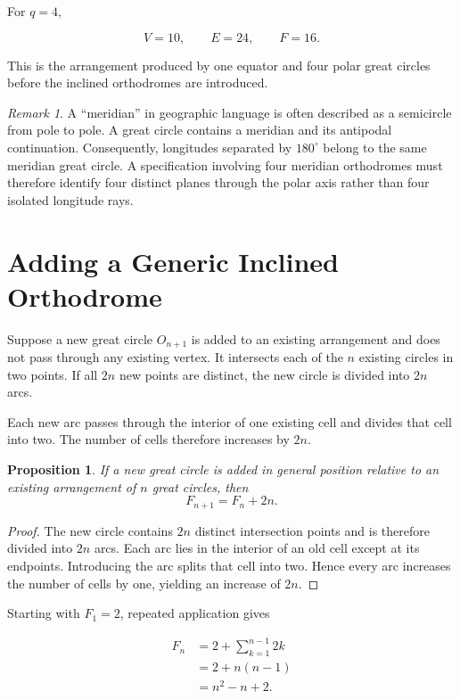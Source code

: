 \documentclass[11pt,fleqn]{book}
\numberwithin{equation}{chapter}
\theoremstyle{plain}
\newtheorem{proposition}[theorem]{Proposition}
\theoremstyle{definition}
\theoremstyle{remark}
\newtheorem{remark}[theorem]{Remark}
\begin{document}
For \(q=4\),

\begin{equation}
    V=10,
    \qquad
    E=24,
    \qquad
    F=16.
\end{equation}

This is the arrangement produced by one equator and four polar great circles before the inclined orthodromes are introduced.

\begin{remark}
A ``meridian'' in geographic language is often described as a semicircle from pole to pole. A great circle contains a meridian and its antipodal continuation. Consequently, longitudes separated by \(180^\circ\) belong to the same meridian great circle. A specification involving four meridian orthodromes must therefore identify four distinct planes through the polar axis rather than four isolated longitude rays.
\end{remark}

\section{Adding a Generic Inclined Orthodrome}

Suppose a new great circle \(O_{n+1}\) is added to an existing arrangement and does not pass through any existing vertex. It intersects each of the \(n\) existing circles in two points. If all \(2n\) new points are distinct, the new circle is divided into \(2n\) arcs.

Each new arc passes through the interior of one existing cell and divides that cell into two. The number of cells therefore increases by \(2n\).

\begin{proposition}
If a new great circle is added in general position relative to an existing arrangement of \(n\) great circles, then
\[
F_{n+1}=F_n+2n.
\]
\end{proposition}

\begin{proof}
The new circle contains \(2n\) distinct intersection points and is therefore divided into \(2n\) arcs. Each arc lies in the interior of an old cell except at its endpoints. Introducing the arc splits that cell into two. Hence every arc increases the number of cells by one, yielding an increase of \(2n\).
\end{proof}

Starting with \(F_1=2\), repeated application gives

\begin{align}
F_n
&=
2+\sum_{k=1}^{n-1}2k
\\
&=
2+n(n-1)
\\
&=
n^2-n+2.
\end{align}
\end{document}
